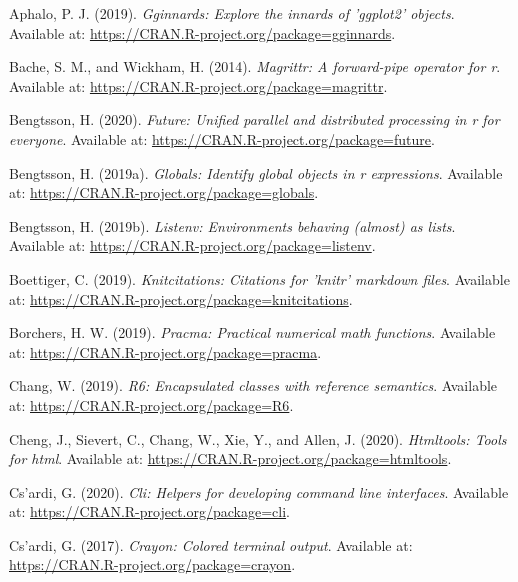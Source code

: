 \documentclass[utf8]{frontiersSCNS}
\begin{document}
\leavevmode\hypertarget{ref-aphalo2019gginnards}{}%
Aphalo, P. J. (2019). \emph{Gginnards: Explore the innards of 'ggplot2'
objects}. Available at:
\url{https://CRAN.R-project.org/package=gginnards}.

\leavevmode\hypertarget{ref-bache2014magrittr}{}%
Bache, S. M., and Wickham, H. (2014). \emph{Magrittr: A forward-pipe
operator for r}. Available at:
\url{https://CRAN.R-project.org/package=magrittr}.

\leavevmode\hypertarget{ref-bengtsson2020future}{}%
Bengtsson, H. (2020). \emph{Future: Unified parallel and distributed
processing in r for everyone}. Available at:
\url{https://CRAN.R-project.org/package=future}.

\leavevmode\hypertarget{ref-bengtsson2019globals}{}%
Bengtsson, H. (2019a). \emph{Globals: Identify global objects in r
expressions}. Available at:
\url{https://CRAN.R-project.org/package=globals}.

\leavevmode\hypertarget{ref-bengtsson2019listenv}{}%
Bengtsson, H. (2019b). \emph{Listenv: Environments behaving (almost) as
lists}. Available at: \url{https://CRAN.R-project.org/package=listenv}.

\leavevmode\hypertarget{ref-boettiger2019knitcitations}{}%
Boettiger, C. (2019). \emph{Knitcitations: Citations for 'knitr'
markdown files}. Available at:
\url{https://CRAN.R-project.org/package=knitcitations}.

\leavevmode\hypertarget{ref-borchers2019pracma}{}%
Borchers, H. W. (2019). \emph{Pracma: Practical numerical math
functions}. Available at:
\url{https://CRAN.R-project.org/package=pracma}.

\leavevmode\hypertarget{ref-chang2019encapsulated}{}%
Chang, W. (2019). \emph{R6: Encapsulated classes with reference
semantics}. Available at: \url{https://CRAN.R-project.org/package=R6}.

\leavevmode\hypertarget{ref-cheng2020htmltools}{}%
Cheng, J., Sievert, C., Chang, W., Xie, Y., and Allen, J. (2020).
\emph{Htmltools: Tools for html}. Available at:
\url{https://CRAN.R-project.org/package=htmltools}.

\leavevmode\hypertarget{ref-csrdi2020helpers}{}%
Cs\a'ardi, G. (2020). \emph{Cli: Helpers for developing command line
interfaces}. Available at: \url{https://CRAN.R-project.org/package=cli}.

\leavevmode\hypertarget{ref-csrdi2017crayon}{}%
Cs\a'ardi, G. (2017). \emph{Crayon: Colored terminal output}. Available
at: \url{https://CRAN.R-project.org/package=crayon}.
\end{document}
